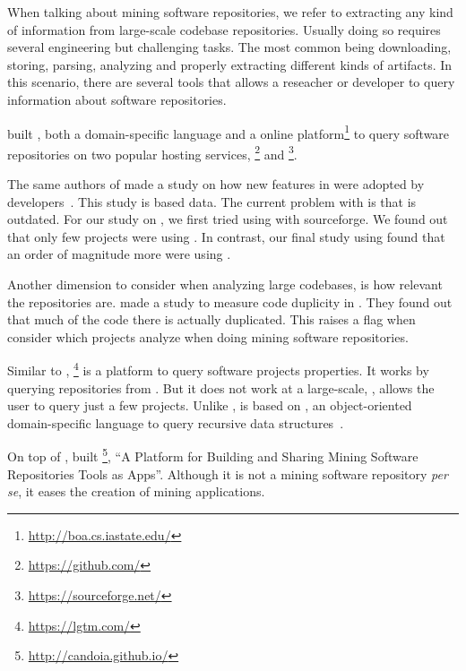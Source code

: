 When talking about mining software repositories, we refer to extracting any kind of information from large-scale codebase repositories.
Usually doing so requires several engineering but challenging tasks.
The most common being downloading, storing, parsing, analyzing and properly extracting different kinds of artifacts.
In this scenario, there are several tools that allows a reseacher or developer to query information about software repositories.

\cite{Dyer-Nguyen-Rajan-Nguyen-13, Dyer-Rajan-Nguyen-13} built \boa{}, both a domain-specific language and a online platform\footnote{\url{http://boa.cs.iastate.edu/}} to query software repositories on two popular hosting services, \github{}\footnote{\url{https://github.com/}} and \sourceforge{}\footnote{\url{https://sourceforge.net/}}.

The same authors of \boa{} made a study on how new features in \java{} were adopted by developers~\cite{Dyer-Rajan-Nguyen-Nguyen-14}.
This study is based \sourceforge{} data.
The current problem with \sourceforge{} is that is outdated.
For our study on \smu{}, we first tried using \boa{} with sourceforge{}.
We found out that only few projects were using \smu{}.
In contrast, our final study using \maven{} found that an order of magnitude more were using \smu{}.

Another dimension to consider when analyzing large codebases, is how relevant the repositories are.
\cite{Lopes:2017:DMC:3152284.3133908} made a study to measure code duplicity in \github{}.
They found out that much of the code there is actually duplicated.
This raises a flag when consider which projects analyze when doing mining software repositories.

Similar to \boa{}, \lgtm{}\footnote{\url{https://lgtm.com/}} is a platform to query software projects properties.
It works by querying repositories from \github{}.
But it does not work at a large-scale, \ie{}, \lgtm{} allows the user to query just a few projects.
Unlike \boa{}, \lgtm{} is based on \ql{}, an object-oriented domain-specific language to query recursive data structures~\cite{Avgustinov:2016ho}.

On top of \boa{}, \cite{Tiwari:2017bs} built \candoia{}\footnote{\url{http://candoia.github.io/}}, ``A Platform for Building and Sharing Mining Software Repositories Tools as Apps''.
Although it is not a mining software repository \emph{per se}, it eases the creation of mining applications.

